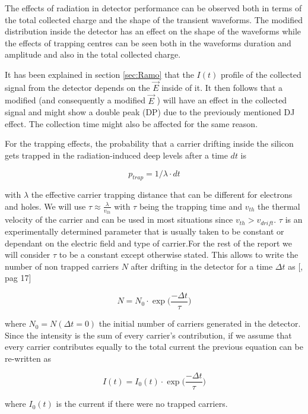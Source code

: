
The effects of radiation in detector performance can be observed both in terms of the total collected charge and the shape of the transient waveforms. The modified \neff distribution inside the detector has an effect on the shape of the waveforms while the effects of trapping centres can be seen both in the waveforms duration and amplitude and also in the total collected charge.

It has been explained in section \ref{sec:Ramo} that the  $ I (t) $ profile of the collected signal from the detector depends on the $\overrightarrow E $ inside of it. It then follows that a modified \neff  (and consequently a modified  $\overrightarrow E$ ) will have an effect in the collected signal and might show a double peak (DP) due to the previously mentioned DJ effect. The collection time might also be affected for the same reason.

For the trapping effects, the probability that a carrier drifting inside the silicon gets trapped in the radiation-induced deep levels after a time $dt$ is

\[p_{trap} = 1/\lambda \cdot dt\] %

with $\lambda$ the effective carrier trapping distance that can be different for electrons and holes. We will use $\tau \approx \frac{\lambda}{v_{th}}$ with $\tau$ being the trapping time and $v_{th}$ the thermal velocity of the carrier and can be used in most situations\cite{Kramberger} since $v_{th} > v_{drift}$. $\tau$ is an experimentally determined parameter that is usually taken to be constant or dependant on the electric field and type of carrier.For the rest of the report we will consider $\tau$ to be a constant except otherwise stated. This allows to write the number of non trapped carriers $N$ after drifting in the detector for a time $\Delta t$ as [\cite{Kramberger}, pag 17]

\[N = N_0 \cdot \exp{\big(\frac{-\Delta t}{\tau}} \big)\]

where $N_0 = N(\Delta t = 0)$ the initial number of carriers generated in the detector. Since the intensity is the sum of every carrier's contribution, if we assume that every carrier contributes equally to the total current the previous equation can be re-written as

\begin{equation}
	I(t) = I_0(t) \cdot \exp{\big(\frac{-\Delta t}{\tau}\big)}
 \label{eq:trapCurr}
\end{equation}

where $ I_{0}(t)$ is the current if there were no trapped carriers. 
